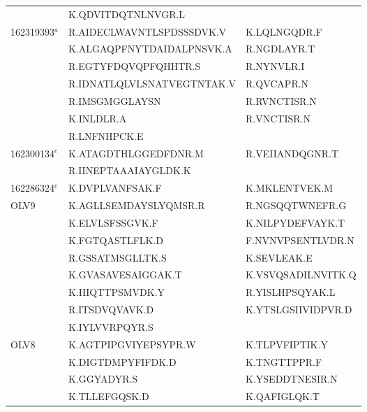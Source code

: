 \begin{longtable}{p{1.5cm}p{6cm}p{6cm}}
  & K.QDVITDQTNLNVGR.L & \\
162319393$^a$ & R.AIDECLWAVNTLSPDSSSDVK.V & K.LQLNGQDR.F \\
  & K.ALGAQPFNYTDAIDALPNSVK.A & R.NGDLAYR.T \\
  & R.EGTYFDQVQPFQHHTR.S & R.NYNVLR.I \\
  & R.IDNATLQLVLSNATVEGTNTAK.V & R.QVCAPR.N \\
  & R.IMSGMGGLAYSN & R.RVNCTISR.N \\
  & K.INLDLR.A  & R.VNCTISR.N \\
  & R.LNFNHPCK.E \\
162300134$^c$ & K.ATAGDTHLGGEDFDNR.M & R.VEIIANDQGNR.T \\
  & R.IINEPTAAAIAYGLDK.K & \\
162286324$^c$ & K.DVPLVANFSAK.F & K.MKLENTVEK.M \\
OLV9 & K.AGLLSEMDAYSLYQMSR.R & R.NGSQQTWNEFR.G\\
  & K.ELVLSFSSGVK.F & K.NILPYDEFVAYK.T\\
  & K.FGTQASTLFLK.D & F.NVNVPSENTLVDR.N\\
  & R.GSSATMSGLLTK.S & K.SEVLEAK.E \\
  & K.GVASAVESAIGGAK.T & K.VSVQSADILNVITK.Q \\
  & K.HIQTTPSMVDK.Y & R.YISLHPSQYAK.L \\
  & R.ITSDVQVAVK.D  & K.YTSLGSIIVIDPVR.D \\
  & K.IYLVVRPQYR.S & \\
OLV8 & K.AGTPIPGVIYEPSYPR.W & K.TLPVFIPTIK.Y \\
  & K.DIGTDMPYFIFDK.D & K.TNGTTPPR.F \\
  & K.GGYADYR.S & K.YSEDDTNESIR.N \\
  & K.TLLEFGQSK.D & K.QAFIGLQK.T \\
\end{longtable}
\endgroup
